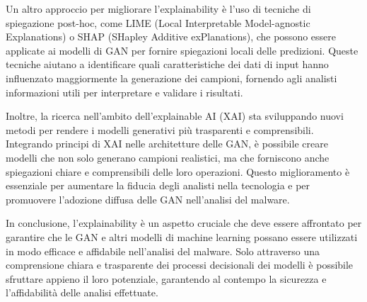 Un altro approccio per migliorare l'explainability è l'uso di tecniche di spiegazione post-hoc, come LIME (Local Interpretable Model-agnostic Explanations) o SHAP (SHapley Additive exPlanations), che possono essere applicate ai modelli di GAN per fornire spiegazioni locali delle predizioni. Queste tecniche aiutano a identificare quali caratteristiche dei dati di input hanno influenzato maggiormente la generazione dei campioni, fornendo agli analisti informazioni utili per interpretare e validare i risultati.

Inoltre, la ricerca nell'ambito dell'explainable AI (XAI) sta sviluppando nuovi metodi per rendere i modelli generativi più trasparenti e comprensibili. Integrando principi di XAI nelle architetture delle GAN, è possibile creare modelli che non solo generano campioni realistici, ma che forniscono anche spiegazioni chiare e comprensibili delle loro operazioni. Questo miglioramento è essenziale per aumentare la fiducia degli analisti nella tecnologia e per promuovere l'adozione diffusa delle GAN nell'analisi del malware.

In conclusione, l'explainability è un aspetto cruciale che deve essere affrontato per garantire che le GAN e altri modelli di machine learning possano essere utilizzati in modo efficace e affidabile nell'analisi del malware. Solo attraverso una comprensione chiara e trasparente dei processi decisionali dei modelli è possibile sfruttare appieno il loro potenziale, garantendo al contempo la sicurezza e l'affidabilità delle analisi effettuate.

